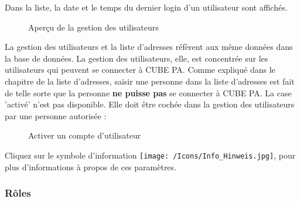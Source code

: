 Dans la liste, la date et le temps du dernier login d'un utilisateur sont affichés. 

\begin{figure}[H]
\caption{Aperçu de la gestion des utilisateurs}
\end{figure}

La gestion des utilisateurs et la liste d'adresses réfèrent aux même données dans la base de données. La gestion des utilisateurs, elle, est concentrée sur les utilisateurs qui peuvent se connecter à CUBE PA. Comme expliqué dans le chapitre de la liste d'adresses, saisir une personne dans la liste d'adresses est fait de telle sorte que la personne \textbf{ne puisse pas} se connecter à CUBE PA. La case 'activé' n'est pas disponible. Elle doit être cochée dans la gestion des utilisateurs par une personne autorisée :

\begin{figure}[H]
\caption{Activer un compte d'utilisateur}
\end{figure}

Cliquez sur le symbole d'information \texttt{[image: /Icons/Info\_Hinweis.jpg]}, pour plus d'informations à propos de ces paramètres.

\vspace{-10pt}

\subsubsection{Rôles}
\label{bkm:Ref445361985}

